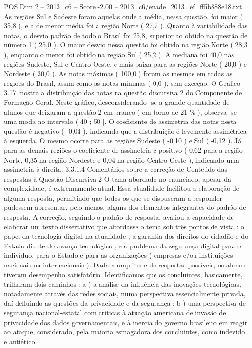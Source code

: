 \begin{textsample}{POS Dim 2 – 2013\_c6 – Score -2.00 – 2013\_c6/enade\_2013\_ef\_ff5b888e18.txt}
As regiões Sul e Sudeste foram aquelas onde a média, nessa questão, foi maior ( 35,8 ), e a de menor média foi a região Norte ( 27,7 ).
Quanto à variabilidade das notas, o desvio padrão de todo o Brasil foi 25,8, superior ao obtido na questão de número 1 ( 25,0 ).
O maior desvio nessa questão foi obtido na região Norte ( 28,3 ), enquanto o menor foi obtido na região Sul ( 25,2 ).
A mediana foi 40,0 nas regiões Sudeste, Sul e Centro-Oeste, e mais baixa para as regiões Norte ( 20,0 ) e Nordeste ( 30,0 ).
As notas máximas ( 100,0 ) foram as mesmas em todas as regiões do Brasil, assim como as notas mínimas ( 0,0 ), sem exceção.
O Gráfico 3.17 mostra a distribuição das notas na questão discursiva 2 do Componente de Formação Geral.
Neste gráfico, desconsiderando -se a grande quantidade de alunos que deixaram a questão 2 em branco ( em torno de 21 \% ), observa -se uma moda no intervalo ( 40 ; 50 ].
O coeficiente de assimetria das notas nesta questão é negativo ( -0,04 ), indicando que a distribuição é levemente assimétrica à esquerda.
O mesmo ocorre para as regiões Sudeste ( -0,10 ) e Sul ( -0,12 ).
Já para as demais regiões o coeficiente de assimetria é positivo ( 0,62 para a região Norte, 0,35 na região Nordeste e 0,04 na região Centro-Oeste ), indicando uma assimetria à direita. 3.3.1.4 Comentários sobre a correção de Conteúdo das respostas à Questão Discursiva 2 O tema abordado no enunciado, apesar da complexidade, é extremamente atual.
Essa atualidade facilitou a elaboração de alguma resposta, permitindo que todos os que se dispuseram a responder pudessem apresentar, pelo menos, alguns dos elementos integrantes do padrão de resposta.
A correção, seguindo o padrão de resposta, avaliou a capacidade de elaborar um texto dissertativo que abordasse o tema sob três pontos de vista : o papel da tecnologia digital na atualidade ; a garantia dos direitos do cidadão e do Estado diante do avanço tecnológico ; e o problema da segurança digital para o indivíduo, para o Estado e para as organizações ( empresas e/ou instituições nacionais ou internacionais ).
Dada a amplitude de respostas possíveis, os alunos tiveram desempenho satisfatório.
Identificamos que os concluintes, basicamente, trilharam dois caminhos : a ) a análise da influência das inovações tecnológicas, notadamente através das redes sociais, numa perspectiva essencialmente privada, daí defluindo as questões da privacidade e da segurança ; b ) uma perspectiva de segurança nacional-estatal com criticas à atuação americana de invasão de privacidade dos dados governamentais, e à inercia do governo brasileiro em reagir ao ataque, considerado, pela maioria esmagadora dos concluintes, como indevido e antiético.

\end{textsample}
